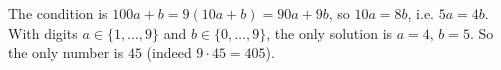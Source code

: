 The condition is $100a+b=9(10a+b)=90a+9b$, so $10a=8b$, i.e. $5a=4b$. With digits $a\in\{1,\dots,9\}$ and $b\in\{0,\dots,9\}$, the only solution is $a=4$, $b=5$. So the only number is $\boxed{45}$ (indeed $9\cdot45=405$).

